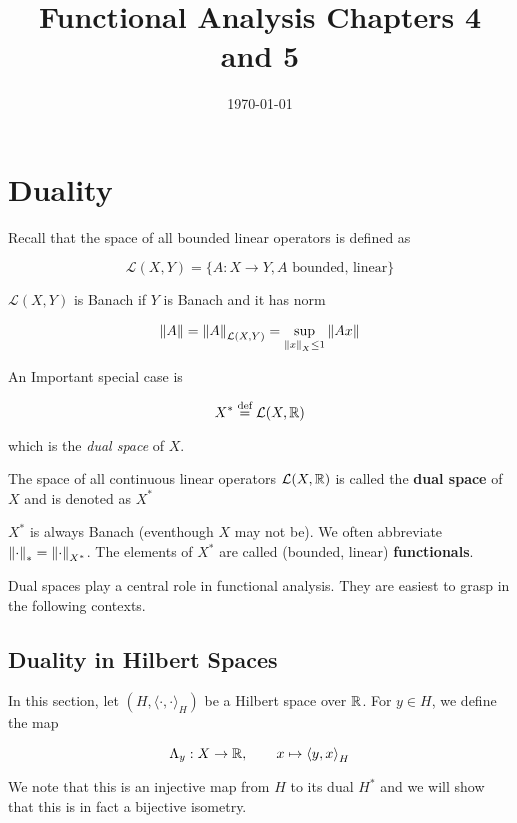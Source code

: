 \documentclass{article}
\title{Functional Analysis Chapters 4 and 5}
\date{\today}
\begin{document}
\maketitle

\section{Duality}  

Recall that the space of all bounded linear operators is defined as

\[
\mathcal{L}(X,Y) = \{A: X \to Y, A \textrm{ bounded, linear}\}
\] 
 
\(\mathcal{L}(X,Y)\) is Banach if  \(Y\) is Banach and it has norm  

\[
\left\|{A}\right\| = \left\|{A}\right\|_{\mathcal{L}(X,Y)} = \sup_{\left\|{x}\right\|_X \leq 1} \left\|{Ax}\right\|
\]  

An Important special case is  

\[
X^* \overset{\textrm{def}}{=} \mathcal{L}(X,\mathbb{R})
\]  

which is the \textit{dual space} of  \(X\).  

\begin{definition}\nextline
    The space of all continuous linear operators  \(\mathcal{L}(X, \mathbb{R})\) is called the \textbf{dual space} of  \(X\) and is denoted as   \(X^*\)
\end{definition}  

\begin{remark}
     \(X^*\) is always Banach (eventhough  \(X\) may not be). We often abbreviate  \(\left\|{\cdot}\right\|_* = \left\|{\cdot}\right\|_{X^*}\). The elements of  \(X^*\) are called (bounded, linear) \textbf{functionals}.
\end{remark}

Dual spaces play a central role in functional analysis. They are easiest to grasp in the following contexts.  

\subsection{Duality in Hilbert Spaces}  
In this section, let  \((H, {\langle \cdot, \cdot \rangle}_H )\) be a Hilbert space over  \(\mathbb{R}\). For  \(y\in H\), we define the map  

\begin{equation*}
    \Lambda_y: X \to \mathbb{R}, \qquad x \mapsto {\langle y, x \rangle}_H
\end{equation*}  

We note that this is an injective map from  \(H\) to its dual  \(H^*\) and we will show that this is in fact a bijective isometry.  
\end{document}
